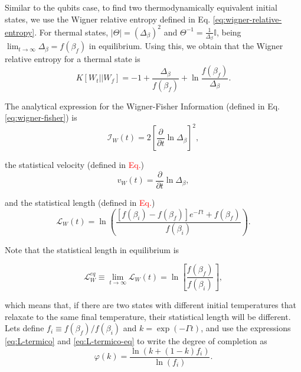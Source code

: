 Similar to the qubits case, to find two thermodynamically equivalent initial states, we use the Wigner relative entropy defined in Eq. \eqref{eq:wigner-relative-entropy}. For thermal states, $|\Theta| = (\Delta_\beta)^2$ and $\Theta^{-1} = \frac{1}{\Delta_\beta} \mathbb{I}$, being $\lim_{t\rightarrow\infty} \Delta_\beta = f(\beta_f)$ in equilibrium. Using this, we obtain that the Wigner relative entropy for a thermal state is
\begin{equation}
    K[W_t || W_f] = -1 + \frac{\Delta_\beta}{f(\beta_f)} + \ln \frac{f(\beta_f)}{\Delta_\beta}.
    \label{eq:K-thermal}
\end{equation}

\noindent The analytical expression for the Wigner-Fisher Information (defined in Eq. \eqref{eq:wigner-fisher}) is
\begin{equation}
    \mathcal{I}_{W} (t) = 2 \left[ \frac{\partial}{\partial t} \ln \Delta_\beta \right]^2,
\end{equation}

\noindent the statistical velocity (defined in \textcolor{red}{Eq.})
\begin{equation}
    v_{W}(t) = \frac{\partial}{\partial t} \ln \Delta_\beta,
\end{equation}

\noindent and the statistical length (defined in \textcolor{red}{Eq.})
\begin{equation}
     \mathcal{L}_{W} (t) = \ln \left( \frac{[f(\beta_i) - f(\beta_f)]e^{-\Gamma t} + f(\beta_f)}{f(\beta_i)} \right).
     \label{eq:L-termico}
\end{equation}

\noindent Note that the statistical length in equilibrium is

\begin{equation}
    \mathcal{L}_{W}^{eq} \equiv \lim_{t \rightarrow \infty} \mathcal{L}_W (t) = \ln\left[ \frac{f(\beta_f)}{f(\beta_i)} \right],
    \label{eq:L-termico-eq}
\end{equation}

\noindent which means that, if there are two states with different initial temperatures that relaxate to the same final temperature, their statistical length will be different. Lets define $f_i \equiv f(\beta_f)/f(\beta_i)$ and $k = \exp(-\Gamma t)$, and use the expressions \eqref{eq:L-termico} and \eqref{eq:L-termico-eq} to write the degree of completion as
\begin{equation}
    \varphi(k) = \frac{\ln (k + (1-k)f_i)}{\ln(f_i)}.
\end{equation}

